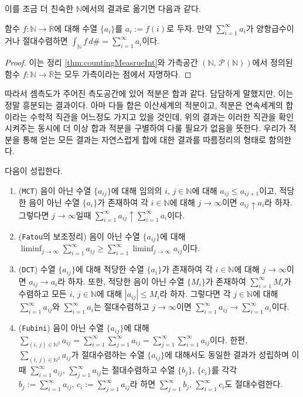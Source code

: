 이를 조금 더 친숙한 $\mathbb{N}$에서의 결과로 옮기면 다음과 같다.

\begin{corollary}
    함수 $f:\mathbb{N}\to\overline{\mathbb{R}}$에 대해 수열 $\{a_i\}$를 $a_i:=f(i)$로 두자. 만약 $\sum_{i=1}^\infty a_i$가 양항급수이거나 절대수렴하면 $\int_\mathbb{N}f\,d\#=\sum_{i=1}^\infty a_i$이다.
\end{corollary}

\begin{proof}
    이는 정리 \ref{thm:countingMeasrueInt}와 가측공간 $(\mathbb{N},\,\mathcal{P}(\mathbb{N}))$에서 정의된 함수 $f:\mathbb{N}\to\overline{\mathbb{R}}$는 모두 가측이라는 점에서 자명하다.
\end{proof}

따라서 셈측도가 주어진 측도공간에 있어 적분은 합과 같다. 담담하게 말했지만, 이는 정말 흥분되는 결과이다. 아마 다들 합은 이산세계의 적분이고, 적분은 연속세계의 합이라는 수학적 직관을 어느정도 가지고 있을 것인데, 위의 결과는 이러한 직관을 확인시켜주는 동시에 더 이상 합과 적분을 구별하여 다룰 필요가 없음을 뜻한다. 우리가 적분을 통해 얻는 모든 결과는 자연스럽게 합에 대한 결과를 따름정리의 형태로 함의한다.

\begin{corollary}
    다음이 성립한다.
    \begin{enumerate}
        \item (\texttt{MCT}) 음이 아닌 수열 $\{a_{ij}\}$에 대해 임의의 $i,\,j\in\mathbb{N}$에 대해 $a_{ij}\leq a_{ij+1}$이고, 적당한 음이 아닌 수열 $\{a_i\}$가 존재하여 각 $i\in\mathbb{N}$에 대해 $j\to\infty$이면 $a_{ij}\uparrow a_i$라 하자. 그렇다면 $j\to\infty$일때 $\sum_{i=1}^\infty a_{ij}\uparrow\sum_{i=1}^\infty a_i$이다.
        \item (\texttt{Fatou}의 보조정리) 음이 아닌 수열 $\{a_{ij}\}$에 대해 $\liminf_{j\to\infty}\sum_{i=1}^\infty a_{ij}\geq\sum_{i=1}^\infty\liminf_{j\to\infty}a_{ij}$이다.
        \item (\texttt{DCT}) 수열 $\{a_{ij}\}$에 대해 적당한 수열 $\{a_i\}$가 존재하여 각 $i\in\mathbb{N}$에 대해 $j\to\infty$이면 $a_{ij}\to a_i$라 하자. 또한, 적당한 음이 아닌 수열 $\{M_i\}$가 존재하여 $\sum_{i=1}^\infty M_i$가 수렴하고 모든 $i,\,j\in\mathbb{N}$에 대해 $|a_{ij}|\leq M_i$라 하자. 그렇다면 각 $j\in\mathbb{N}$에 대해 $\sum_{i=1}^\infty a_{ij}$와 $\sum_{i=1}^\infty a_i$는 절대수렴하고 $j\to\infty$이면 $\sum_{i=1}^\infty a_{ij}\to\sum_{i=1}^\infty a_i$이다.
        \item (\texttt{Fubini}) 음이 아닌 수열 $\{a_{ij}\}$에 대해 $\sum_{(i,\,j)\in\mathbb{N}^2}a_{ij}=\sum_{i=1}^\infty\sum_{j=1}^\infty a_{ij}=\sum_{j=1}^\infty\sum_{i=1}^\infty a_{ij}$이다. 한편, $\sum_{(i,\,j)\in\mathbb{N}^2}a_{ij}$가 절대수렴하는 수열 $\{a_{ij}\}$에 대해서도 동일한 결과가 성립하며 이때 $\sum_{i=1}^\infty a_{ij},\,\sum_{j=1}^\infty a_{ij}$는 절대수렴하고 수열 $\{b_j\},\,\{c_i\}$를 각각 $b_j:=\sum_{i=1}^\infty a_{ij},\,c_i:=\sum_{j=1}^\infty a_{ij}$라 하면 $\sum_{j=1}^\infty b_j,\,\sum_{i=1}^\infty c_i$도 절대수렴한다.
    \end{enumerate}
\end{corollary}


